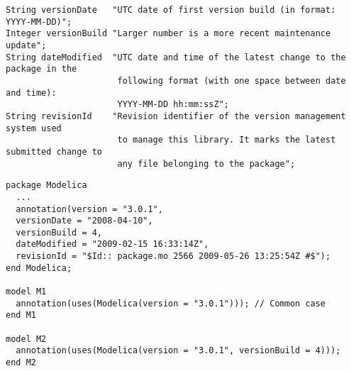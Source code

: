 \begin{lstlisting}[language=modelica]
String versionDate   "UTC date of first version build (in format: YYYY-MM-DD)";
Integer versionBuild "Larger number is a more recent maintenance update";
String dateModified  "UTC date and time of the latest change to the package in the
                      following format (with one space between date and time):
                      YYYY-MM-DD hh:mm:ssZ";
String revisionId    "Revision identifier of the version management system used
                      to manage this library. It marks the latest submitted change to
                      any file belonging to the package";
\end{lstlisting}

\begin{example}
\begin{lstlisting}[language=modelica]
package Modelica
  ...
  annotation(version = "3.0.1",
  versionDate = "2008-04-10",
  versionBuild = 4,
  dateModified = "2009-02-15 16:33:14Z",
  revisionId = "$Id:: package.mo 2566 2009-05-26 13:25:54Z #$");
end Modelica;

model M1
  annotation(uses(Modelica(version = "3.0.1"))); // Common case
end M1

model M2
  annotation(uses(Modelica(version = "3.0.1", versionBuild = 4)));
end M2
\end{lstlisting}
\end{example}

